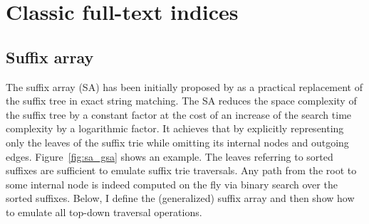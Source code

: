 \section{Classic full-text indices}

\subsection{Suffix array}
\label{sec:index:sa}

The suffix array (SA) has been initially proposed by \cite{Manber1990} as a practical replacement of the suffix tree in exact string matching.
The SA reduces the space complexity of the suffix tree by a constant factor at the cost of an increase of the search time complexity by a logarithmic factor.
It achieves that by explicitly representing only the leaves of the suffix trie while omitting its internal nodes and outgoing edges.
Figure~\ref{fig:sa_gsa} shows an example.
The leaves referring to sorted suffixes are sufficient to emulate suffix trie traversals.
Any path from the root to some internal node is indeed computed on the fly via binary search over the sorted suffixes.
Below, I define the (generalized) suffix array and then show how to emulate all top-down traversal operations.



